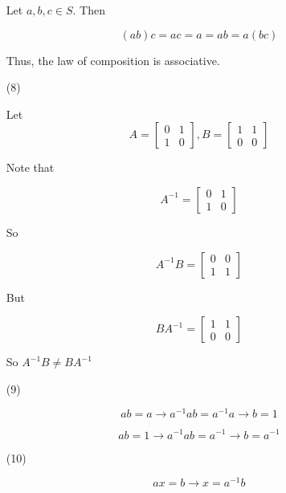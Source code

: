 \documentclass[12pt]{article}
\begin{document}
\begin{itemize}
Let $a, b, c \in S$. Then

$$(ab)c = ac = a = ab = a(bc)$$

Thus, the law of composition is associative.

\item[(8)]

Let $$A = \begin{bmatrix}

0 & 1 \\

1 & 0

\end{bmatrix}, B = \begin{bmatrix}

1 & 1 \\

0 & 0

\end{bmatrix}$$

Note that

$$A^{-1} = \begin{bmatrix}

0 & 1 \\

1 & 0

\end{bmatrix}$$

So

$$A^{-1}B = \begin{bmatrix}

0 & 0 \\

1 & 1

\end{bmatrix}$$

But

$$BA^{-1} = \begin{bmatrix}

1 & 1 \\

0 & 0

\end{bmatrix}$$

So $A^{-1}B \neq BA^{-1}$

\item[(9)]

$$ab = a \rightarrow a^{-1}ab = a^{-1}a \rightarrow b = 1$$

$$ab = 1 \rightarrow a^{-1}ab = a^{-1} \rightarrow b = a^{-1}$$

\item[(10)]

$$ax = b \rightarrow x = a^{-1}b$$


\end{itemize}
\end{document}
